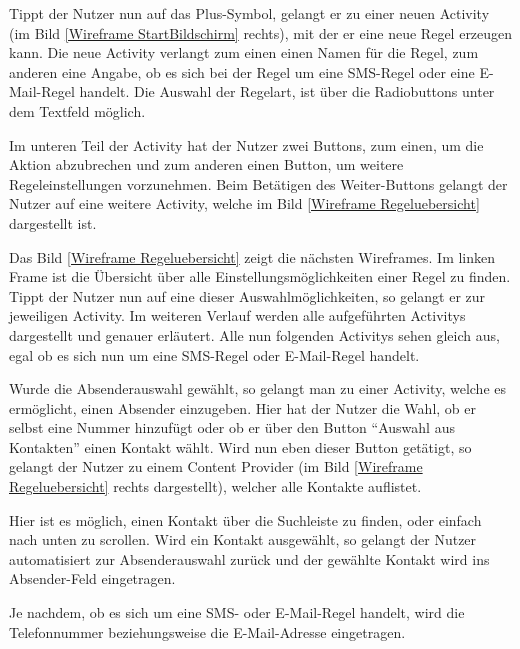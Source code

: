 Tippt der Nutzer nun auf das Plus-Symbol, gelangt er zu einer neuen Activity (im Bild \ref{Wireframe StartBildschirm} rechts), mit der er eine neue Regel erzeugen kann.
Die neue Activity verlangt zum einen einen Namen f\"ur die Regel, zum anderen eine Angabe, ob es sich bei der Regel um eine SMS-Regel oder eine E-Mail-Regel handelt. Die Auswahl der Regelart, ist \"uber die Radiobuttons unter dem Textfeld m\"oglich.

Im unteren Teil der Activity hat der Nutzer zwei Buttons, zum einen, um die Aktion abzubrechen und zum anderen einen Button, um weitere Regeleinstellungen vorzunehmen.
Beim Bet\"atigen des Weiter-Buttons gelangt der Nutzer auf eine weitere Activity, welche im Bild \ref{Wireframe Regeluebersicht} dargestellt ist.

Das Bild \ref{Wireframe Regeluebersicht} zeigt die n\"achsten Wireframes. Im linken Frame ist die \"Ubersicht \"uber alle Einstellungsm\"oglichkeiten einer Regel zu finden. Tippt der Nutzer nun auf eine dieser Auswahlm\"oglichkeiten, so gelangt er zur jeweiligen Activity. Im weiteren Verlauf werden alle aufgef\"uhrten Activitys dargestellt und genauer erl\"autert.
Alle nun folgenden Activitys sehen gleich aus, egal ob es sich nun um eine SMS-Regel oder E-Mail-Regel handelt.

Wurde die Absenderauswahl gew\"ahlt, so gelangt man zu einer Activity, welche es erm\"oglicht, einen Absender einzugeben. Hier hat der Nutzer die Wahl, ob er selbst eine Nummer hinzuf\"ugt oder ob er \"uber den Button "`Auswahl aus Kontakten"' einen Kontakt w\"ahlt. Wird nun eben dieser Button get\"atigt, so gelangt der Nutzer zu einem Content Provider (im Bild \ref{Wireframe Regeluebersicht} rechts dargestellt), welcher alle Kontakte auflistet. 

Hier ist es m\"oglich, einen Kontakt \"uber die Suchleiste zu finden, oder einfach nach unten zu scrollen. Wird ein Kontakt ausgew\"ahlt, so gelangt der Nutzer automatisiert zur Absenderauswahl zur\"uck und der gew\"ahlte Kontakt wird ins Absender-Feld eingetragen.

Je nachdem, ob es sich um eine SMS- oder E-Mail-Regel handelt, wird die Telefonnummer beziehungsweise die E-Mail-Adresse eingetragen.

